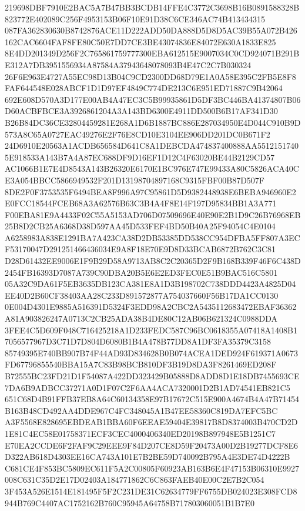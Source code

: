 \documentclass[UTF8,fontset=fandol,zihao=-4,a4paper]{ctexart}
\begin{document}
{{219698DBF7910E2BAC5A7B47BB3BCDB14FFE4C3772C3698B16B0891588328B823772E402089C256F4953153B06F10E91D38C6CE346AC74B413434315
087FA362830630B8742876ACE11D222ADD50DA888D5D8D5AC39B55A072B426162CAC6604FAF8FE80C50E7DD7CE3BE43074836E84072E630A1833E825
8E4DD201349D256F2C765861759777300EBA612515E9007034C0CD924071B291BE312A7DB3951556934A87584A37943648078093B4E47C2C7B030324
26F6E963E4727A55EC98D13B04C9CD2300DD68D79E1A0A58E395C2FB5E8F8FAF644548E028ABCF1D1D97EF4849C774DE213C6E951ED71887C9B42064
692E608D570A3D177E00AB4A47EC3C5B99935861D5DF3BC446BA41374807B06D60ACBFBCE3A3926861204A3A143BD6300E4911DD500B6B17AF341D30
B26B84DC36CE32804459281E268A1D6B1887BC886E287034950E4D044C910B9D573A8C65A0727EAC49276E2F76E8CD10E3104EE906DD201DC0B671F2
24D6910E20563A1ACDB656584D641C8A1DEBCDA474837400888AA55121517405E918533A143B7A4A87EC688DF9D16EF1D12C4F63020BE44B2129CD57
AC1066B1E7E4D8543A143B26320E6170E1BC976E747E99433A80C5826ACA40CE3A054BBCC5866949532F201D13198704897168C9315FBF00B87D507F
8DE2F0F3753535F6494BEA8F996A97C95861D5D9382448938E6BEBA946960E2E0FCC18544FCEB68A3A62576B63C3B4A4F8E14F197D95834BB1A3A771
F00EBA81E9A4433F02C55A5153AD706D07509696E40E90E2B1D9C26B76968EB25B8D2CB25A6368D38D597AA45D533FEF4BD50B40A25F94054C4E0104
A6258983A838E1291BA7A423CA38D2DB53385DD538CC954DFBA5FF807A3ECF53170047D291251466436034E9A8F18E70E9D8D33BCAB6872B762C3C81
D28D61432EE9006E1F9B29D58A9713AB8C2C20365D2F9B168B339F46F6C438D2454FB16393D7087A739C90DBA20B5E6E2ED3FEC0E51B9BAC516C5801
05A32C9DA61F5EB3635DB123CA381E8A1D3B198702C738DDD4423A4825D04EE40D2B60CF38403AA28C233D891572877A754037660F56B17DA1CC0130
0E004D4301E9885A516391D5324F3EDD98A2CBC2A5435112683472EBAF36362A81A903826247A0713C2CB25ADA38B4DE80C12AB06B621324C0988DDA
3FEE4C5D609F048C716425218A1D233FEDC587C96BC0618355A07418A1408B17056577967D3C71D7D804D6080B1B4A478B77DD8A1DF3FA35379C3158
85749395E740BB907B74F44AD93D834628B0B074ACEA1DED924F619371A0673FD67796855540BBA15A7C83B98BCB810DF3B19D8DA3F8261469ED208F
B72555BC23FD21D1F54087A422DD323429B05888D8ADD8D1E18DB7455693CE7DA6B9ADBCC37271A0D1F07C2F6AA4ACA7320001D2B1AD74541EB821C5
651C68D4B91FFB37EB8A64C60134358E97B17672C515E900A4674B4A47B71454B163B48CD492AA4DDE967C4FC348045A1B47EE58360C819DA7EFC5BC
A3F5568E828695EBDEAB1BBA60F6EEAE59404E39817B8D8374003B470CD2D1E81C4EC58E01758371ECF3CEC4000406340ED20198B897948E5B1251C7
E70EA2CCDE6F2FAF9C29EEE9F84D207CE8D59F20473A00D2B19277DCF8E6D322AB618D4303EE16CA743A101E7B2BE59D740092B795A4E3DE74D4222B
C681CE4F853BC5809EC611F5A2C00805F60923AB163B6E4F47153B06310E9927008C631C35D2E17D02403A184771862C6C863FAEB40E00C2E7B2C054
3F453A526E1514E181495F5F2C231DE31C62634779FF6755DB024023E308FCD8944B769C4407AC1752162B760C95945A64758B717803060051B1B7E0
}}
\end{document}
